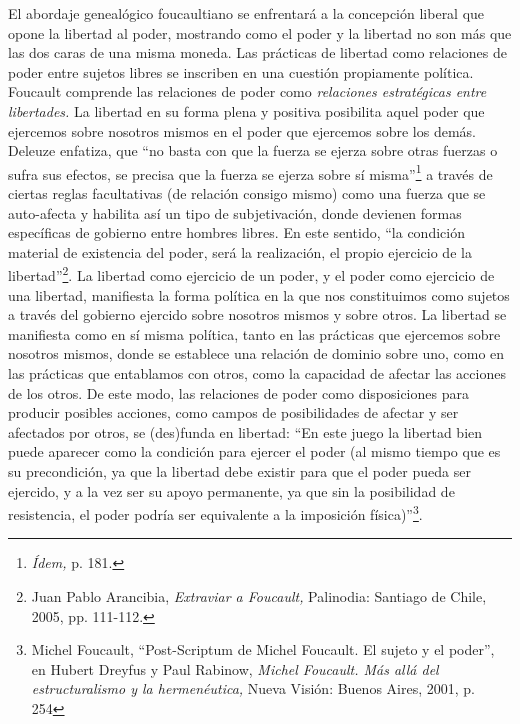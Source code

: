 El abordaje genealógico foucaultiano se enfrentará a la concepción liberal que opone la libertad al poder, mostrando como el poder y la libertad no son más que las dos caras de una misma moneda. Las prácticas de libertad como relaciones de poder entre sujetos libres se inscriben en una cuestión propiamente política. Foucault comprende las relaciones de poder como \emph{relaciones estratégicas entre libertades.} La libertad en su forma plena y positiva posibilita aquel poder que ejercemos sobre nosotros mismos en el poder que ejercemos sobre los demás. Deleuze enfatiza, que \enquote{no basta con que la fuerza se ejerza sobre otras fuerzas o sufra sus efectos, se precisa que la fuerza se ejerza sobre sí misma}\footnote{\emph{Ídem,} p. 181.} a través de ciertas reglas facultativas (de relación consigo mismo) como una fuerza que se auto-afecta y habilita así un tipo de subjetivación, donde devienen formas específicas de gobierno entre hombres libres. En este sentido, \enquote{la condición material de existencia del poder, será la realización, el propio ejercicio de la libertad}\footnote{Juan Pablo Arancibia, \emph{Extraviar a Foucault,} Palinodia: Santiago de Chile, 2005, pp. 111-112.}. La libertad como ejercicio de un poder, y el poder como ejercicio de una libertad, manifiesta la forma política en la que nos constituimos como sujetos a través del gobierno ejercido sobre nosotros mismos y sobre otros. La libertad se manifiesta como en sí misma política, tanto en las prácticas que ejercemos sobre nosotros mismos, donde se establece una relación de dominio sobre uno, como en las prácticas que entablamos con otros, como la capacidad de afectar las acciones de los otros. De este modo, las relaciones de poder como disposiciones para producir posibles acciones, como campos de posibilidades de afectar y ser afectados por otros, se (des)funda en libertad: \enquote{En este juego la libertad bien puede aparecer como la condición para ejercer el poder (al mismo tiempo que es su precondición, ya que la libertad debe existir para que el poder pueda ser ejercido, y a la vez ser su apoyo permanente, ya que sin la posibilidad de resistencia, el poder podría ser equivalente a la imposición física)}\footnote{Michel Foucault, \enquote{Post-Scriptum de Michel Foucault. El sujeto y el poder}, en Hubert Dreyfus y Paul Rabinow, \emph{Michel Foucault. Más allá del estructuralismo y la hermenéutica,} Nueva Visión: Buenos Aires, 2001, p. 254}.

